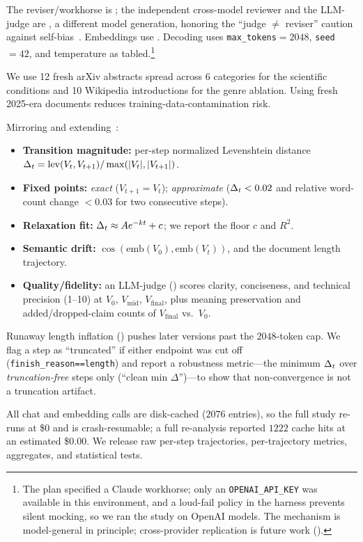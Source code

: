  The reviser/workhorse is \gptone; the independent cross-model reviewer and the
LLM-judge are \gpto, a different model generation, honoring the ``judge $\neq$ reviser''
caution against self-bias~\citep{xu2024pride}. Embeddings use \embedmodel. Decoding uses
\texttt{max\_tokens}$=2048$, \texttt{seed}$=42$, and temperature as tabled.\footnote{The plan
specified a Claude workhorse; only an \texttt{OPENAI\_API\_KEY} was available in this
environment, and a loud-fail policy in the harness prevents silent mocking, so we ran the
study on OpenAI models. The mechanism is model-general in principle;
cross-provider replication is future work ().}

 We use 12 fresh arXiv abstracts spread across 6 categories for the scientific
conditions and 10 Wikipedia introductions for the genre ablation. Using fresh 2025-era
documents reduces training-data-contamination risk.

 Mirroring and extending~\citet{wu2026converge}:
\begin{itemize}[leftmargin=*,itemsep=1pt,topsep=1pt]
    \item \textbf{Transition magnitude:} per-step normalized Levenshtein distance
    $\Delta_t = \mathrm{lev}(V_t,V_{t+1})/\max(|V_t|,|V_{t+1}|)$.
    \item \textbf{Fixed points:} \emph{exact} ($V_{t+1}=V_t$); \emph{approximate}
    ($\Delta_t<0.02$ and relative word-count change $<0.03$ for two consecutive steps).
    \item \textbf{Relaxation fit:} $\Delta_t \approx A e^{-kt} + c$; we report the floor $c$ and
    $R^2$.
    \item \textbf{Semantic drift:} $\cos(\mathrm{emb}(V_0),\mathrm{emb}(V_t))$, and the
    document length trajectory.
    \item \textbf{Quality/fidelity:} an LLM-judge (\gpto) scores clarity, conciseness, and
    technical precision (1--10) at $V_0$, $V_\text{mid}$, $V_\text{final}$, plus
    meaning preservation and added/dropped-claim counts of $V_\text{final}$ vs.\ $V_0$.
\end{itemize}

 Runaway length inflation () pushes later
versions past the $2048$-token cap. We flag a step as ``truncated'' if either endpoint was cut
off (\texttt{finish\_reason==length}) and report a robustness metric---the minimum $\Delta_t$ over
\emph{truncation-free} steps only (``clean min $\Delta$'')---to show that non-convergence is
not a truncation artifact.

 All chat and embedding calls are disk-cached ($2076$ entries), so the
full study re-runs at \$0 and is crash-resumable; a full re-analysis reported $1222$ cache
hits at an estimated \$0.00. We release raw per-step trajectories, per-trajectory metrics,
aggregates, and statistical tests.
